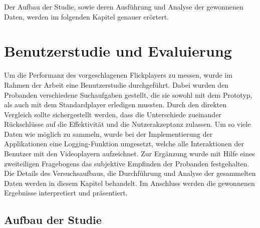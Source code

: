 \documentclass[11pt,a4paper]{report}
\begin{document}
Der Aufbau der Studie, sowie deren Ausführung und Analyse der gewonnenen Daten, werden im folgenden Kapitel genauer erörtert.

\chapter{Benutzerstudie und Evaluierung}

Um die Performanz des vorgeschlagenen Flickplayers zu messen, wurde im Rahmen der Arbeit eine Benutzerstudie durchgeführt. Dabei wurden den Probanden verschiedene Suchaufgaben gestellt, die sie sowohl mit dem Prototyp, als auch mit dem Standardplayer erledigen mussten. Durch den direkten Vergleich sollte sichergestellt werden, dass die Unterschiede zueinander Rückschlüsse auf die Effektivität und die Nutzerakzeptanz zulassen. Um so viele Daten wie möglich zu sammeln, wurde bei der Implementierung der Applikationen eine Logging-Funktion umgesetzt, welche alle Interaktionen der Benutzer mit den Videoplayern aufzeichnet. Zur Ergänzung wurde mit Hilfe eines zweiteiligen Fragebogens das subjektive Empfinden der Probanden festgehalten. Die Details des Versuchsaufbaus, die Durchführung und Analyse der gesammelten Daten werden in diesem Kapitel behandelt. Im Anschluss werden die gewonnenen Ergebnisse interpretiert und präsentiert.

\section{Aufbau der Studie}
\end{document}
